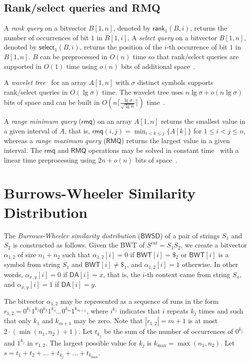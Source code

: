 \documentclass{elsarticle}
\newcommand{\rank}{\ensuremath{\mathsf{rank}}\xspace}
\newcommand{\select}{\ensuremath{\mathsf{select}}\xspace}
\newcommand{\DA}{\ensuremath{\mathsf{DA}}\xspace}
\newcommand{\BWT}{\ensuremath{\mathsf{BWT}}\xspace}
\newcommand{\BWSD}{\ensuremath{\mathsf{BWSD}}\xspace}
\newcommand{\B}{\ensuremath{\mathsf{\alpha}}\xspace}
\newcommand{\RMQ}{\ensuremath{\mathsf{RMQ}}\xspace}
\newcommand{\rmq}{\ensuremath{\mathsf{rmq}}\xspace}
\begin{document}
\subsection{Rank/select queries and RMQ}

A {\em rank query} on a bitvector $B[1,n]$, denoted by $\rank_1(B,i)$, returns
the number of occurrences of bit $1$ in $B[1,i]$.
A {\em select query} on a bitvector $B[1,n]$, denoted by $\select_1(B,i)$, returns
the position of the $i$-th occurrence of bit $1$ in $B[1,n]$.
$B$ can be preprocessed in $O(n)$ time so that rank/select queries are supported
in $O(1)$ time using $o(n)$ bits of additional space~\cite{Munro1996}.

A {\em wavelet tree}~\cite{Grossi2003} for an array $A[1,n]$ with $\sigma$ distinct
symbols supports rank/select queries in $O(\lg \sigma)$ time.
The wavelet tree uses $n \lg \sigma +o(n \lg \sigma)$ bits of space and
can be built in $O(n \lceil \frac{\lg \sigma}{\sqrt{\lg
n}} \rceil)$ time~\cite{Munro2016}.

A {\em range minimum query} (\rmq) on an array $A[1,n]$ returns the smallest value in
a given interval of $A$, that is, $\rmq(i,j) = \min_{i < k \leq j} \{A[k]\}$ for $1
\le i <j \le n$, whereas a {\em range maximum query} (\RMQ)
returns the largest value in a given interval.
The \rmq and \RMQ operations may be solved in constant
time~\cite{GearyRRR04,OhlebuschG09} with a linear time preprocessing using
$2n+o(n)$ bits of space~\cite{Fischer2006}.

\section{Burrows-Wheeler Similarity Distribution}\label{s:bwsd}


The {\em Burrows-Wheeler similarity distribution} (\BWSD) of a pair of strings
$S_1$ and $S_2$
is constructed as follows.  Given the BWT of $S^{cat}=S_1S_2$, we create a
bitvector $\B_{1,2}$ of size $n_1+n_2$ such that $\B_{1,2}[i]=0$ if $\BWT[i]=\$_2$
or $\BWT[i]$ is a symbol from string $S_1$ and $\BWT[i]\neq\$_1$, and
$\B_{1,2}[i]=1$ otherwise.
In other words, $\B_{x,y}[i]=0$ if $\DA[i]=x$, that is, the $i$-th context came from string $S_x$,
and $\B_{x,y}[i]=1$ if $\DA[i]=y$.


The bitvector $\B_{1,2}$ may be represented as a sequence of runs in
the form $r_{1,2} = 0^{k_1}1^{k_2}0^{k_3}1^{k_4}\ldots0^{k_m}1^{k_{m+1}}$, where
$i^{k_j}$ indicates that $i$ repeats $k_j$ times and such that only $k_1$ and
$k_{m+1}$ may be zero.  Note that $|r_{1,2}|=m+1$ is at most
$2 \cdot (\min(n_1,n_2)+1)$.
Let $t_{k_j}$ be the sum of the number of occurrences of $0^{k_j}$ and
$1^{k_j}$ in $r_{1,2}$.
The largest possible value for $k_j$ is $k_{\max}=\max(n_1,n_2)$.
Let $s = t_1+t_2+\ldots+t_{k_j}+\ldots+t_{k_{\max}}$.
\end{document}
